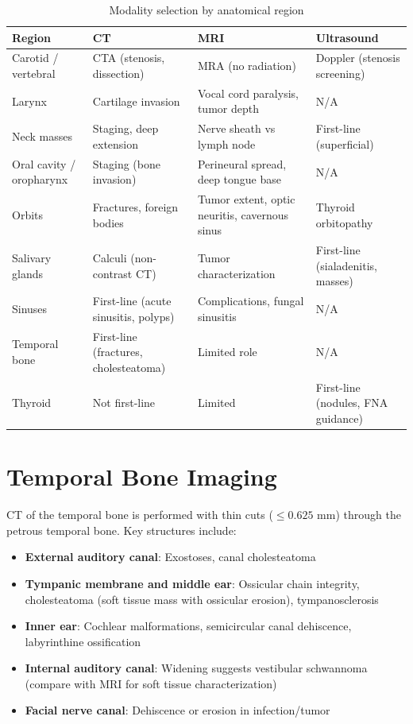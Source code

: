 \begin{table}[h]
\centering
\caption{Modality selection by anatomical region}
\begin{tabular}{p{3.5cm} p{3.5cm} p{3.5cm} p{3.5cm}}
\hline
\textbf{Region} & \textbf{CT} & \textbf{MRI} & \textbf{Ultrasound} \\
\hline
Carotid / vertebral & CTA (stenosis, dissection) & MRA (no radiation) & Doppler (stenosis screening) \\
Larynx & Cartilage invasion & Vocal cord paralysis, tumor depth & N/A \\
Neck masses & Staging, deep extension & Nerve sheath vs lymph node & First-line (superficial) \\
Oral cavity / oropharynx & Staging (bone invasion) & Perineural spread, deep tongue base & N/A \\
Orbits & Fractures, foreign bodies & Tumor extent, optic neuritis, cavernous sinus & Thyroid orbitopathy \\
Salivary glands & Calculi (non-contrast CT) & Tumor characterization & First-line (sialadenitis, masses) \\
Sinuses & First-line (acute sinusitis, polyps) & Complications, fungal sinusitis & N/A \\
Temporal bone & First-line (fractures, cholesteatoma) & Limited role & N/A \\
Thyroid & Not first-line & Limited & First-line (nodules, FNA guidance) \\
\hline
\end{tabular}
\end{table}


\section{Temporal Bone Imaging}
CT of the temporal bone is performed with thin cuts ($\leq 0.625$ mm) through the petrous temporal bone. Key structures include:

\begin{itemize}
  \item \textbf{External auditory canal}: Exostoses, canal cholesteatoma
  \item \textbf{Tympanic membrane and middle ear}: Ossicular chain integrity, cholesteatoma (soft tissue mass with ossicular erosion), tympanosclerosis
  \item \textbf{Inner ear}: Cochlear malformations, semicircular canal dehiscence, labyrinthine ossification
  \item \textbf{Internal auditory canal}: Widening suggests vestibular schwannoma (compare with MRI for soft tissue characterization)
  \item \textbf{Facial nerve canal}: Dehiscence or erosion in infection/tumor
\end{itemize}

